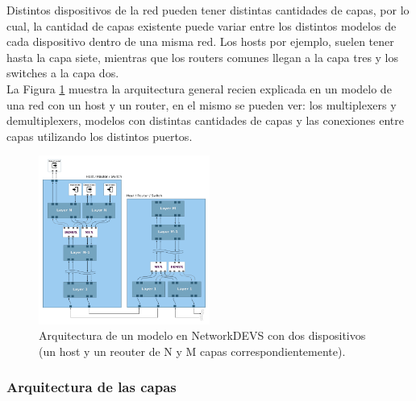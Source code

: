 \documentclass[10pt,a4paper]{article}
\begin{document}
Distintos dispositivos de la red pueden tener distintas cantidades de capas, por lo cual, la cantidad de capas existente puede variar entre los distintos modelos de cada dispositivo dentro de una misma red. Los hosts por ejemplo, suelen tener hasta la capa siete, mientras que los routers comunes llegan a la capa tres y los switches a la capa dos. \\

La Figura \ref{figure:general architecture} muestra la arquitectura general recien explicada en un modelo de una red con un host y un router, en el mismo se pueden ver: los multiplexers y demultiplexers, modelos con distintas cantidades de capas y las conexiones entre capas utilizando los distintos puertos. \\

\begin{figure}[htbp]
    \centering
    \includegraphics[width = 0.5\textwidth]{img/png/general_architecture.png}
    \caption{Arquitectura de un modelo en NetworkDEVS con dos dispositivos (un host y un reouter de N y M capas correspondientemente).}
    \label{figure:general architecture}
\end{figure}

\newpage

\subsubsection{Arquitectura de las capas}
\end{document}
